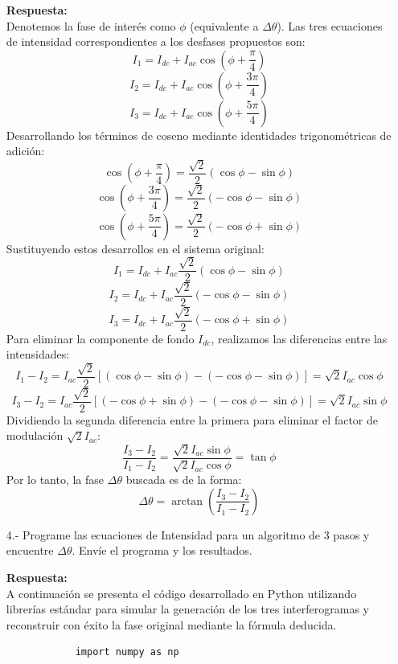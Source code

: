 \documentclass[12pt,letterpaper]{article}
\begin{document}
\begin{enumerate}
		\vspace{0.3cm}
		\textbf{Respuesta:} \\
		Denotemos la fase de interés como $\phi$ (equivalente a $\Delta\theta$). Las tres ecuaciones de intensidad correspondientes a los desfases propuestos son:
		\[ I_1 = I_{dc} + I_{ac} \cos\left(\phi + \frac{\pi}{4}\right) \]
		\[ I_2 = I_{dc} + I_{ac} \cos\left(\phi + \frac{3\pi}{4}\right) \]
		\[ I_3 = I_{dc} + I_{ac} \cos\left(\phi + \frac{5\pi}{4}\right) \]
		Desarrollando los términos de coseno mediante identidades trigonométricas de adición:
		\[ \cos\left(\phi + \frac{\pi}{4}\right) = \frac{\sqrt{2}}{2}(\cos\phi - \sin\phi) \]
		\[ \cos\left(\phi + \frac{3\pi}{4}\right) = \frac{\sqrt{2}}{2}(-\cos\phi - \sin\phi) \]
		\[ \cos\left(\phi + \frac{5\pi}{4}\right) = \frac{\sqrt{2}}{2}(-\cos\phi + \sin\phi) \]
		Sustituyendo estos desarrollos en el sistema original:
		\[ I_1 = I_{dc} + I_{ac} \frac{\sqrt{2}}{2}(\cos\phi - \sin\phi) \]
		\[ I_2 = I_{dc} + I_{ac} \frac{\sqrt{2}}{2}(-\cos\phi - \sin\phi) \]
		\[ I_3 = I_{dc} + I_{ac} \frac{\sqrt{2}}{2}(-\cos\phi + \sin\phi) \]
		Para eliminar la componente de fondo $I_{dc}$, realizamos las diferencias entre las intensidades:
		\[ I_1 - I_2 = I_{ac} \frac{\sqrt{2}}{2} \left[ (\cos\phi - \sin\phi) - (-\cos\phi - \sin\phi) \right] = \sqrt{2} I_{ac} \cos\phi \]
		\[ I_3 - I_2 = I_{ac} \frac{\sqrt{2}}{2} \left[ (-\cos\phi + \sin\phi) - (-\cos\phi - \sin\phi) \right] = \sqrt{2} I_{ac} \sin\phi \]
		Dividiendo la segunda diferencia entre la primera para eliminar el factor de modulación $\sqrt{2}I_{ac}$:
		\[ \frac{I_3 - I_2}{I_1 - I_2} = \frac{\sqrt{2} I_{ac} \sin\phi}{\sqrt{2} I_{ac} \cos\phi} = \tan\phi \]
		Por lo tanto, la fase $\Delta\theta$ buscada es de la forma:
		\[ \Delta\theta = \arctan\left(\frac{I_3 - I_2}{I_1 - I_2}\right) \]
		\vspace{0.5cm}
		
		\item[4.-] Programe las ecuaciones de Intensidad para un algoritmo de 3 pasos y encuentre $\Delta\theta$. Envíe el programa y los resultados.
		
		\vspace{0.3cm}
		\textbf{Respuesta:} \\
		A continuación se presenta el código desarrollado en Python utilizando librerías estándar para simular la generación de los tres interferogramas y reconstruir con éxito la fase original mediante la fórmula deducida.
		
		\begin{verbatim}
			import numpy as np
			

\end{verbatim}
\end{enumerate}
\end{document}
